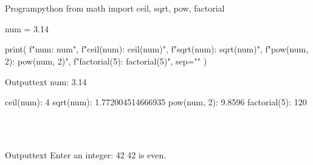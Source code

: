 \documentclass[11pt]{ipu-python}
\begin{document}
    \\~\vfill%
    \vfill
    \newpage
    \begin{code}
        {Program}{python}
from math import ceil, sqrt, pow, factorial

num = 3.14

print(
    f"num: {num}\n",
    f"ceil(num): {ceil(num)}",
    f"sqrt(num): {sqrt(num)}",
    f"pow(num, 2): {pow(num, 2)}",
    f"factorial(5): {factorial(5)}",
    sep="\n"
)
    \end{code}
    \begin{code}
        {Output}{text}
num: 3.14

ceil(num): 4
sqrt(num): 1.772004514666935
pow(num, 2): 9.8596
factorial(5): 120
    \end{code}

    \\~\\%
    \begin{code}
        {Output}{text}
Enter an integer: 42
42 is even.
    \end{code}
\end{document}

